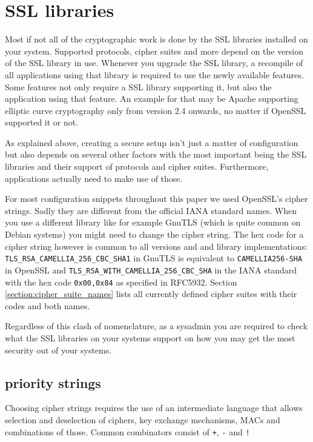 \section{SSL libraries}
\label{section:ssllibs}

Most if not all of the cryptographic work is done by the SSL libraries installed on
your system. Supported protocols, cipher suites and more depend on the version of
the SSL library in use. Whenever you upgrade the SSL library, a recompile of all
applications using that library is required to use the newly available features.
Some features not only require a SSL library supporting it, but also the application
using that feature. An example for that may be Apache supporting elliptic curve
cryptography only from version 2.4 onwards, no matter if OpenSSL supported it or
not.

As explained above, creating a secure setup isn't just a matter of
configuration but also depends on several other factors with the most important
being the SSL libraries and their support of protocols and cipher suites.
Furthermore, applications actually need to make use of those.

For most configuration snippets throughout this paper we used OpenSSL's cipher
strings. Sadly they are different from the official IANA standard names. When you
use a different library like for example GnuTLS (which is quite common on Debian
systems) you might need to change the cipher string. The hex code for a cipher
string however is common to all versions and and library implementations:
\texttt{TLS\_RSA\_CAMELLIA\_256\_CBC\_SHA1} in GnuTLS is equivalent to
\texttt{CAMELLIA256-SHA} in OpenSSL and \texttt{TLS\_RSA\_WITH\_CAMELLIA\_256\_CBC\_SHA}
in the IANA standard with the hex code \texttt{0x00,0x84} as specified
in RFC5932\cite{rfc5932}. Section \ref{section:cipher_suite_names}
lists all currently defined cipher suites with their codes and both names.

Regardless of this clash of nomenclature, as a sysadmin you are required to check what the SSL libraries on
your systems support on how you may get the most security out of your systems.

\subsection{priority strings}

Choosing cipher strings requires the use of an intermediate language that allows selection
and deselection of ciphers, key exchange mechanisms, MACs and combinations of those.
Common combinators consist of \texttt{+}, \texttt{-} and \texttt{!}

